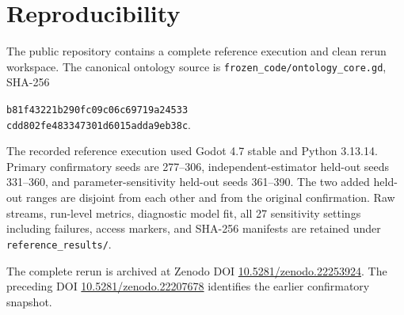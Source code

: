 \documentclass[10pt,journal,onecolumn]{IEEEtran}
\begin{document}
\enlargethispage{4\baselineskip}
\section{Reproducibility}
The public repository contains a complete reference execution and clean rerun workspace. The canonical ontology source is \texttt{frozen\_code/ontology\_core.gd}, SHA-256
\begin{center}
\small\texttt{b81f43221b290fc09c06c69719a24533}\\
\texttt{cdd802fe483347301d6015adda9eb38c}.
\end{center}
The recorded reference execution used Godot 4.7 stable and Python 3.13.14. Primary confirmatory seeds are 277--306, independent-estimator held-out seeds 331--360, and parameter-sensitivity held-out seeds 361--390. The two added held-out ranges are disjoint from each other and from the original confirmation. Raw streams, run-level metrics, diagnostic model fit, all 27 sensitivity settings including failures, access markers, and SHA-256 manifests are retained under \texttt{reference\_results/}.

The complete rerun is archived at Zenodo DOI \href{https://doi.org/10.5281/zenodo.22253924}{10.5281/zenodo.22253924}. The preceding DOI \href{https://doi.org/10.5281/zenodo.22207678}{10.5281/zenodo.22207678} identifies the earlier confirmatory snapshot.
\end{document}
